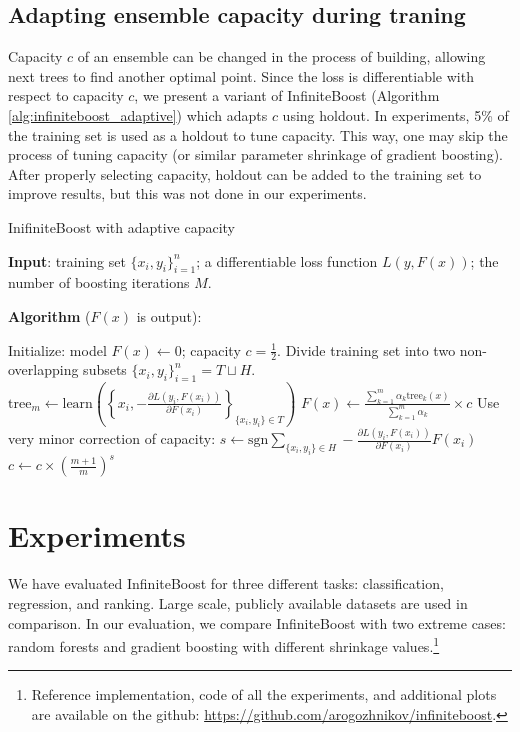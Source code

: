 \subsection{Adapting ensemble capacity during traning}

Capacity $c$ of an ensemble can be changed in the process of building, allowing next trees to find another optimal point.
Since the loss is differentiable with respect to capacity $c$, we present a variant of InfiniteBoost (Algorithm \ref{alg:infiniteboost_adaptive}) which adapts $c$ using holdout.
In experiments, 5\% of the training set is used as a holdout to tune capacity.
This way, one may skip the process of tuning capacity (or similar parameter shrinkage of gradient boosting).
After properly selecting capacity, holdout can be added to the training set to improve results, but this was not done in our experiments.

\begin{algorithm}[!h]
  \caption{InifiniteBoost with adaptive capacity}\label{alg:infiniteboost_adaptive}
  {\bf Input}: training set $\{x_i, y_i\}_{i=1}^n$; a differentiable loss function $L(y, F(x))$; the number of boosting iterations $M$.

  {\bf Algorithm} ($F(x)$ is output):
  \begin{algorithmic}
    \State Initialize: model $F(x) \gets 0$; capacity $c=\frac{1}{2}$.
    \State Divide training set into two non-overlapping subsets $\{x_i, y_i\}_{i=1}^n=T\sqcup H$.
      \State $\text{tree}_m \gets \text{learn}\left(\left\{x_i, -\frac{\partial L(y_i, F(x_i))}{\partial F(x_i)}\right\}_{\{x_i, y_i\}\in T}\right)$
      \State $F(x) \gets \frac{\sum_{k=1}^m \alpha_k \text{tree}_k(x)}{\sum_{k=1}^m \alpha_k} \times c$
      \State Use very minor correction of capacity:
      \State $s \gets \text{sgn} \sum_{\{x_i, y_i\}\in H} -\frac{\partial L(y_i, F(x_i))}{\partial F(x_i)} F(x_i)$
      \State $c \gets c\times \left(\frac{m+1}{m}\right)^s$
    \EndFor
  \end{algorithmic}
\end{algorithm}

\section{Experiments}
We have evaluated InfiniteBoost for three different tasks: classification, regression, and ranking. 
Large scale, publicly available datasets are used in comparison. 
In our evaluation, we compare InfiniteBoost with two extreme cases: random forests and gradient boosting with different shrinkage values.\footnote{
  Reference implementation, code of all the experiments, and additional plots are available on the github: \url{https://github.com/arogozhnikov/infiniteboost}.
}

